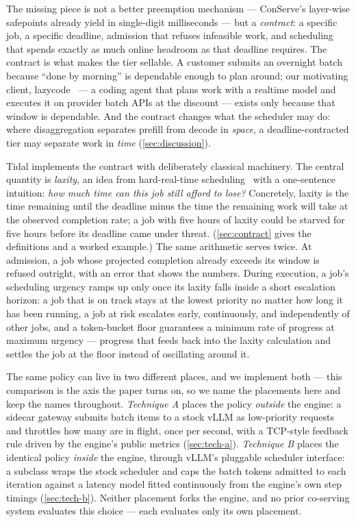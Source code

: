 \documentclass[11pt]{article}
\begin{document}
The missing piece is not a better preemption mechanism --- ConServe's layer-wise
safepoints already yield in single-digit milliseconds --- but a \emph{contract}: a
specific job, a specific deadline, admission that refuses infeasible work, and scheduling
that spends exactly as much online headroom as that deadline requires. The contract is
what makes the tier sellable. A customer submits an overnight batch because ``done by
morning'' is dependable enough to plan around; our motivating client,
lazycode~\citep{lazycode,lazycode-paper} --- a coding agent that plans work with a
realtime model and executes it on provider batch APIs at the discount --- exists only
because that window is dependable. And the contract changes what the scheduler may do:
where disaggregation separates prefill from decode in \emph{space}, a
deadline-contracted tier may separate work in \emph{time} (\cref{sec:discussion}).

Tidal implements the contract with deliberately classical machinery. The central
quantity is \emph{laxity}, an idea from hard-real-time scheduling~\citep{llf} with a
one-sentence intuition: \emph{how much time can this job still afford to lose?}
Concretely, laxity is the time remaining until the deadline minus the time the remaining
work will take at the observed completion rate; a job with five hours of laxity could be
starved for five hours before its deadline came under threat.
(\cref{sec:contract} gives the definitions and a worked example.) The same arithmetic
serves twice. At admission, a job whose projected completion already exceeds its window
is refused outright, with an error that shows the numbers. During execution, a job's
scheduling urgency ramps up only once its laxity falls inside a short escalation
horizon: a job that is on track stays at the lowest priority no matter how long it has
been running, a job at risk escalates early, continuously, and independently of other
jobs, and a token-bucket floor guarantees a minimum rate of progress at maximum urgency
--- progress that feeds back into the laxity calculation and settles the job at the
floor instead of oscillating around it.

The same policy can live in two different places, and we implement both --- this
comparison is the axis the paper turns on, so we name the placements here and keep the
names throughout. \emph{Technique A} places the policy \emph{outside} the engine: a
sidecar gateway submits batch items to a stock vLLM as low-priority requests and
throttles how many are in flight, once per second, with a TCP-style feedback rule
driven by the engine's public metrics (\cref{sec:tech-a}). \emph{Technique B} places the
identical policy \emph{inside} the engine, through vLLM's pluggable scheduler
interface: a subclass wraps the stock scheduler and caps the batch tokens admitted to
each iteration against a latency model fitted continuously from the engine's own step
timings (\cref{sec:tech-b}). Neither placement forks the engine, and no prior
co-serving system evaluates this choice --- each evaluates only its own placement.
\end{document}

